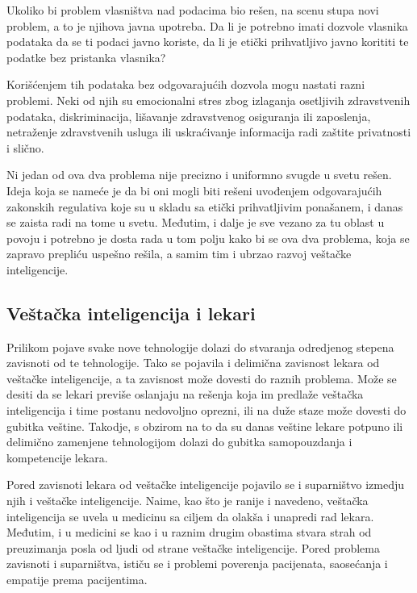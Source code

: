 \documentclass[a4paper]{article}
\begin{document}
Ukoliko bi problem vlasništva nad podacima bio rešen, na scenu stupa novi problem, a to je njihova javna upotreba. Da li je potrebno imati dozvole vlasnika podataka da se ti podaci javno koriste, da li je etički prihvatljivo javno korititi te podatke bez pristanka vlasnika?

Korišćenjem tih podataka bez odgovarajućih dozvola mogu nastati razni problemi. Neki od njih su emocionalni stres zbog izlaganja osetljivih zdravstvenih podataka, diskriminacija, lišavanje zdravstvenog osiguranja ili zaposlenja, netraženje zdravstvenih usluga ili uskraćivanje informacija radi zaštite privatnosti i slično.

Ni jedan od ova dva problema nije precizno i uniformno svugde u svetu rešen. Ideja koja se nameće je da bi oni mogli biti rešeni uvođenjem odgovarajućih zakonskih regulativa koje su u skladu sa etički prihvatljivim ponašanem, i danas se zaista radi na tome u svetu. Međutim, i dalje je sve vezano za tu oblast u povoju i potrebno je dosta rada u tom polju kako bi se ova dva problema, koja se zapravo prepliću uspešno rešila, a samim tim i ubrzao razvoj veštačke inteligencije. \cite{ai_in_medicine}

\subsection{Veštačka inteligencija i lekari}
\label{subsec:veštačka_inteligencija_i_lekari}

Prilikom pojave svake nove tehnologije dolazi do stvaranja odredjenog stepena zavisnoti od te tehnologije. Tako se pojavila i delimična zavisnost lekara od veštačke inteligencije, a ta zavisnost može dovesti do raznih problema. Može se desiti da se lekari previše oslanjaju na rešenja koja im predlaže veštačka inteligencija i time postanu nedovoljno oprezni, ili na duže staze može dovesti do gubitka veštine. Takodje, s obzirom na to da su danas veštine lekare potpuno ili delimično zamenjene tehnologijom dolazi do gubitka samopouzdanja i kompetencije lekara.

Pored zavisnoti lekara od veštačke inteligencije pojavilo se i suparništvo izmedju njih i veštačke inteligencije. Naime, kao što je ranije i navedeno, veštačka inteligencija se uvela u medicinu sa ciljem da olakša i unapredi rad lekara. Međutim, i u medicini se kao i u raznim drugim obastima stvara strah od preuzimanja posla od ljudi od strane veštačke inteligencije. Pored problema zavisnoti i suparništva, ističu se i problemi poverenja pacijenata, saosećanja i empatije prema pacijentima.
\end{document}
